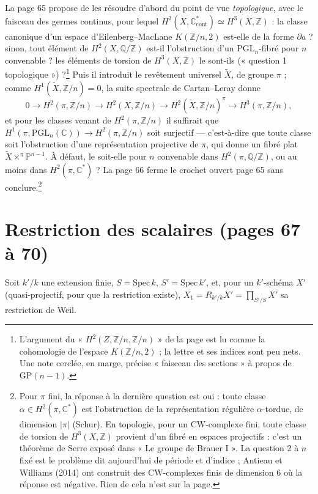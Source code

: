 \documentclass[11pt,a4paper]{article}
\begin{document}
La page 65 propose de les résoudre d'abord du point de vue
\emph{topologique}, avec le faisceau des germes continus, pour lequel $H^2(X,
\mathbb{C}^{*}_{\mathrm{cont}}) \simeq H^3(X, \mathbb{Z})$ : la classe canonique
d'un espace d'Eilenberg–MacLane $K(\mathbb{Z}/n, 2)$ est-elle de la forme
$\partial a$ ? sinon, tout élément de $H^2(X, \mathbb{Q}/\mathbb{Z})$
est-il l'obstruction d'un $\mathrm{PGL}_n$-fibré pour $n$ convenable ? les
éléments de torsion de $H^3(X, \mathbb{Z})$ le sont-ils (« question 1
topologique ») ?\footnote{L'argument du « $H^2(Z, \mathbb{Z}/n, \mathbb{Z}/n)$ »
de la page est lu comme la cohomologie de l'espace $K(\mathbb{Z}/n, 2)$ ; la
lettre et ses indices sont peu nets. Une note cerclée, en marge, précise
« faisceau des sections » à propos de $\mathrm{GP}(n-1)$.} Puis il introduit le
revêtement universel $\widetilde{X}$, de groupe $\pi$ ; comme $H^1(\widetilde{X},
\mathbb{Z}/n) = 0$, la suite spectrale de Cartan–Leray donne
\[
0 \to H^2(\pi, \mathbb{Z}/n) \to H^2(X, \mathbb{Z}/n) \to H^2(\widetilde{X},
\mathbb{Z}/n)^{\pi} \to H^3(\pi, \mathbb{Z}/n),
\]
et pour les classes venant de $H^2(\pi, \mathbb{Z}/n)$ il suffirait que
$H^1(\pi, \mathrm{PGL}_n(\mathbb{C})) \to H^2(\pi, \mathbb{Z}/n)$ soit
surjectif — c'est-à-dire que toute classe soit l'obstruction d'une
représentation projective de $\pi$, qui donne un fibré plat $\widetilde{X}
\times^{\pi} \mathbb{P}^{n-1}$. À défaut, le soit-elle pour $n$ convenable
dans $H^2(\pi, \mathbb{Q}/\mathbb{Z})$, ou au moins dans $H^2(\pi,
\mathbb{C}^{*})$ ? La page 66 ferme le crochet ouvert page 65 sans
conclure.\footnote{Pour $\pi$ fini, la réponse à la dernière question est
oui : toute classe $\alpha \in H^2(\pi, \mathbb{C}^{*})$ est l'obstruction de
la représentation régulière $\alpha$-tordue, de dimension $|\pi|$ (Schur). En
topologie, pour un CW-complexe fini, toute classe de torsion de $H^3(X,
\mathbb{Z})$ provient d'un fibré en espaces projectifs : c'est un théorème de
Serre exposé dans « Le groupe de Brauer I ». La question 2 à $n$ fixé est le
problème dit aujourd'hui de période et d'indice ; Antieau et Williams (2014)
ont construit des CW-complexes finis de dimension 6 où la réponse est
négative. Rien de cela n'est sur la page.}

\section*{Restriction des scalaires (pages 67 à 70)}

Soit $k'/k$ une extension finie, $S = \mathrm{Spec}\,k$, $S' = \mathrm{Spec}\,k'$,
et, pour un $k'$-schéma $X'$ (quasi-projectif, pour que la restriction existe),
$X_1 = R_{k'/k}X' = \prod_{S'/S} X'$ sa restriction de Weil.
\end{document}
